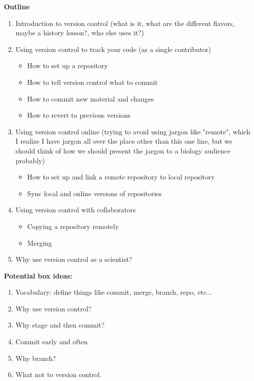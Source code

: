 \textbf{Outline}

\begin{enumerate}
  \item Introduction to version control (what is it, what are the different flavors, maybe a history lesson?, who else uses it?)
  \item Using version control to track your code (as a single contributor)
  \begin{itemize}
    \item How to set up a repository
    \item How to tell version control what to commit
    \item How to commit new material and changes
    \item How to revert to previous versions
  \end{itemize}
  \item Using version control online (trying to avoid using jargon like "remote", which I realize I have jargon all over the place other than this one line, but we should think of how we should present the jargon to a biology audience probably)
  \begin{itemize}
    \item How to set up and link a remote repository to local repository
    \item Sync local and online versions of repositories
  \end{itemize}
  \item Using version control with collaborators
    \begin{itemize}
      \item Copying a repository remotely
      \item Merging
  \end{itemize}
  \item Why use version control as a scientist?
\end{enumerate}



\textbf{Potential box ideas:}
\begin{enumerate}
  \item Vocabulary: define things like commit, merge, branch, repo, etc...
  \item Why use version control?
  \item Why stage and then commit?
  \item Commit early and often
  \item Why branch?
  \item What not to version control.
\end{enumerate}